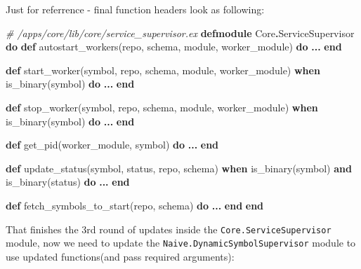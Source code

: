 \documentclass[
]{book}
\newenvironment{Shaded}{\begin{snugshade}}{\end{snugshade}}
\newcommand{\CommentTok}[1]{\textcolor[rgb]{0.56,0.35,0.01}{\textit{#1}}}
\newcommand{\ConstantTok}[1]{\textcolor[rgb]{0.00,0.00,0.00}{#1}}
\newcommand{\KeywordTok}[1]{\textcolor[rgb]{0.13,0.29,0.53}{\textbf{#1}}}
\newcommand{\NormalTok}[1]{#1}
\newcommand{\OperatorTok}[1]{\textcolor[rgb]{0.81,0.36,0.00}{\textbf{#1}}}
\begin{document}
Just for referrence - final function headers look as following:

\begin{Shaded}
\begin{Highlighting}[]
  \CommentTok{\# /apps/core/lib/core/service\_supervisor.ex}
\KeywordTok{defmodule} \ConstantTok{Core}\OperatorTok{.}\ConstantTok{ServiceSupervisor} \KeywordTok{do}
  \KeywordTok{def}\NormalTok{ autostart\_workers(repo, schema, module, worker\_module) }\KeywordTok{do}
    \OperatorTok{...}
  \KeywordTok{end}

  \KeywordTok{def}\NormalTok{ start\_worker(symbol, repo, schema, module, worker\_module)}
      \KeywordTok{when}\NormalTok{ is\_binary(symbol) }\KeywordTok{do}
    \OperatorTok{...}
  \KeywordTok{end}

  \KeywordTok{def}\NormalTok{ stop\_worker(symbol, repo, schema, module, worker\_module)}
      \KeywordTok{when}\NormalTok{ is\_binary(symbol) }\KeywordTok{do}
    \OperatorTok{...}
  \KeywordTok{end}

  \KeywordTok{def}\NormalTok{ get\_pid(worker\_module, symbol) }\KeywordTok{do}
    \OperatorTok{...}
  \KeywordTok{end}

  \KeywordTok{def}\NormalTok{ update\_status(symbol, status, repo, schema)}
      \KeywordTok{when}\NormalTok{ is\_binary(symbol) }\KeywordTok{and}\NormalTok{ is\_binary(status) }\KeywordTok{do}
    \OperatorTok{...}
  \KeywordTok{end}

  \KeywordTok{def}\NormalTok{ fetch\_symbols\_to\_start(repo, schema) }\KeywordTok{do}
    \OperatorTok{...}
  \KeywordTok{end}
\KeywordTok{end}
\end{Highlighting}
\end{Shaded}

That finishes the 3rd round of updates inside the \texttt{Core.ServiceSupervisor} module, now we need to update the \texttt{Naive.DynamicSymbolSupervisor} module to use updated functions(and pass required arguments):
\end{document}
